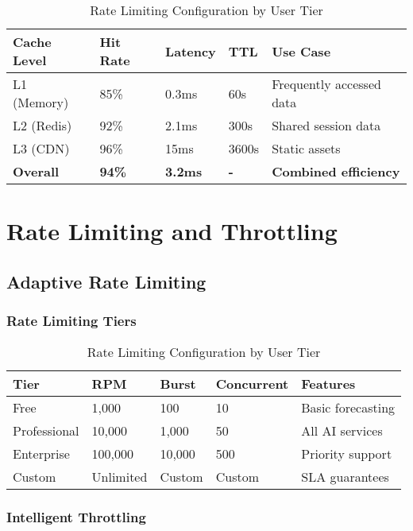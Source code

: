 \begin{table}[H]
\begin{table}[H]
\centering
\caption{Cache Performance Results}
\begin{tabular}{|p{3cm}|p{2cm}|p{2cm}|p{2cm}|p{3cm}|}
\hline
\textbf{Cache Level} & \textbf{Hit Rate} & \textbf{Latency} & \textbf{TTL} & \textbf{Use Case} \\
\hline
L1 (Memory) & 85\% & 0.3ms & 60s & Frequently accessed data \\
\hline
L2 (Redis) & 92\% & 2.1ms & 300s & Shared session data \\
\hline
L3 (CDN) & 96\% & 15ms & 3600s & Static assets \\
\hline
\textbf{Overall} & \textbf{94\%} & \textbf{3.2ms} & \textbf{-} & \textbf{Combined efficiency} \\
\hline
\end{tabular}
\end{table}

\section{Rate Limiting and Throttling}

\subsection{Adaptive Rate Limiting}

\subsubsection{Rate Limiting Tiers}

\begin{table}[H]
\centering
\caption{Rate Limiting Configuration by User Tier}
\begin{tabular}{|p{2cm}|p{2cm}|p{2cm}|p{2cm}|p{4cm}|}
\hline
\textbf{Tier} & \textbf{RPM} & \textbf{Burst} & \textbf{Concurrent} & \textbf{Features} \\
\hline
Free & 1,000 & 100 & 10 & Basic forecasting \\
\hline
Professional & 10,000 & 1,000 & 50 & All AI services \\
\hline
Enterprise & 100,000 & 10,000 & 500 & Priority support \\
\hline
Custom & Unlimited & Custom & Custom & SLA guarantees \\
\hline
\end{tabular}
\end{table}

\subsubsection{Intelligent Throttling}


\end{table}
